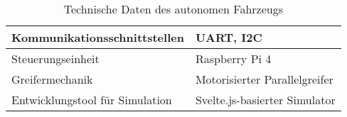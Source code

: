 \documentclass[main.tex]{subfiles} %
\begin{document}
\begin{table}[h!]
\begin{tabular}{|l|l|}
        Kommunikationsschnittstellen       & UART, I2C                                                                 \\ \hline
        Steuerungseinheit                  & Raspberry Pi 4                                                            \\ \hline %
        Greifermechanik                    & Motorisierter Parallelgreifer                                             \\ \hline
        Entwicklungstool für Simulation    & Svelte.js-basierter Simulator                                             \\ \hline
    \end{tabular}
    \caption{Technische Daten des autonomen Fahrzeugs}
    \label{tab:hardfacts}
\end{table}
\end{document}
